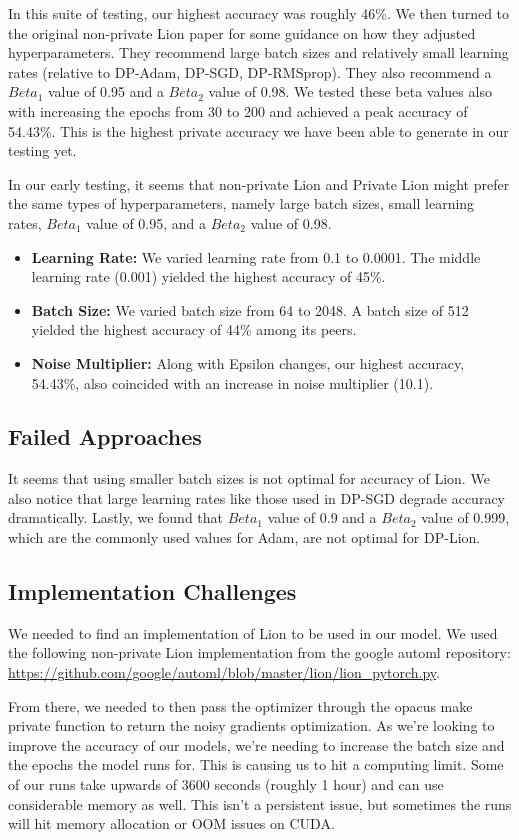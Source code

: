 In this suite of testing, our highest accuracy was roughly 46\%. We then turned to the original non-private Lion paper for some guidance on how they adjusted hyperparameters. They recommend 
large batch sizes and relatively small learning rates (relative to DP-Adam, DP-SGD, DP-RMSprop). They also recommend a $Beta_{1}$ value of 0.95 and a $Beta_{2}$ value of 0.98. We tested
these beta values also with increasing the epochs from 30 to 200 and achieved a peak accuracy of 54.43\%. This is the highest private accuracy we have been able to generate in our testing
yet. 

In our early testing, it seems that non-private Lion and Private Lion might prefer the same types of hyperparameters, namely large batch sizes, small learning rates, $Beta_{1}$ value of 0.95,
and a $Beta_{2}$ value of 0.98.

\begin{itemize}
    \item \textbf{Learning Rate:} We varied learning rate from 0.1 to 0.0001. The middle learning rate (0.001) yielded the highest accuracy of 45\%.
    \item \textbf{Batch Size:} We varied batch size from 64 to 2048. A batch size of 512 yielded the highest accuracy of 44\% among its peers.
    \item \textbf{Noise Multiplier:} Along with Epsilon changes, our highest accuracy, 54.43\%, also coincided with an increase in noise multiplier (10.1).
\end{itemize}

\subsection{Failed Approaches}\label{subsec:failed-approaches2}
It seems that using smaller batch sizes is not optimal for accuracy of Lion. We also notice that large learning rates like those used in DP-SGD degrade accuracy dramatically. Lastly, 
we found that $Beta_{1}$ value of 0.9 and a $Beta_{2}$ value of 0.999, which are the commonly used values for Adam, are not optimal for DP-Lion.

\subsection{Implementation Challenges}\label{subsec:implementation-challenges2}
We needed to find an implementation of Lion to be used in our model. We used the following non-private Lion implementation from the google automl repository: 
\url{https://github.com/google/automl/blob/master/lion/lion_pytorch.py}. 

From there, we needed to then pass the optimizer through the opacus make private function to return the noisy gradients optimization.
As we're looking to improve the accuracy of our models, we're needing to increase the batch size and the epochs the model runs for. This is causing us to hit a computing
limit. Some of our runs take upwards of 3600 seconds (roughly 1 hour) and can use considerable memory as well. This isn't a persistent issue, but sometimes the runs will hit memory
allocation or OOM issues on CUDA.
